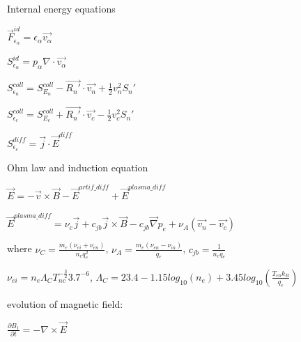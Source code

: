 \documentclass{beamer}
\begin{document}
\begin{frame}{Internal energy equations}

$\vec{F}_{\epsilon_\alpha}^{id} =  \epsilon_\alpha \vec{v_\alpha}  $ 

$S_{\epsilon_{\alpha}}^{id} = p_\alpha \nabla \cdot \vec{v_\alpha} $

$S_{\epsilon_{n}}^{coll} = S_{E_{n}}^{coll} - \vec{R_n'} \cdot \vec{v_n} + \frac{1}{2} v_n^2 S_n' $ 

$S_{\epsilon_{c}}^{coll} = S_{E_{c}}^{coll} + \vec{R_n'} \cdot \vec{v_c} - \frac{1}{2} v_c^2 S_n' $ 

$S_{\epsilon_c}^{diff}  = \vec{j} \cdot \vec{E}^{diff} $ 

\end{frame}

\begin{frame}{Ohm law and induction equation}

$\vec{E} = - \vec{v} \times \vec{B} - \vec{E}^{artif\_diff} + \vec{E}^{plasma\_diff}$

$\vec{E}^{plasma\_diff} = \nu_c \vec{j} + c_{jb}  \vec{j} \times \vec{B} - c_{jb} \vec{\nabla} p_e  + \nu_A (\vec{v_n} - \vec{v_c})$

where $\nu_C = \frac{m_e(\nu_{ei}+\nu_{en})}{n_e q_e^2}$, $\nu_A= \frac{m_e(\nu_{en}-\nu_{in})}{q_e} $, $c_{jb} = \frac{1}{n_e q_e}$

$\nu_{ei} = n_e \Lambda_C T_{nc}^{-\frac{3}{2}} 3.7^{-6}$, $\Lambda_C = 23.4 - 1.15 log_{10}(n_e)+3.45 log_{10}(\frac{T_{cn}k_B}{q_e})$


evolution of magnetic field:

$\frac{\partial B_1}{\partial t} = - \nabla \times \vec{E}$

\end{frame}
\end{document}
